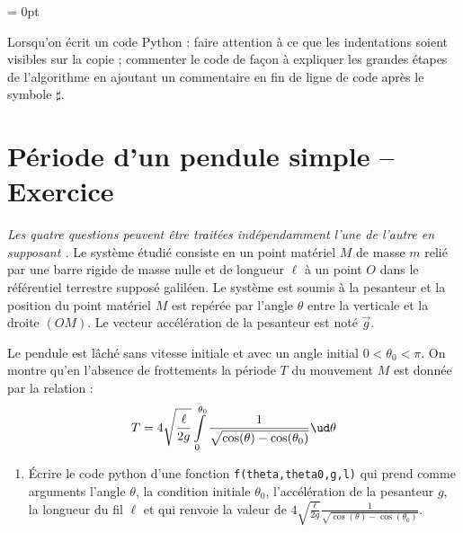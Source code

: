 
\parindent= 0pt
\textheight 250mm

  \pagestyle{fancy}
  \fancyfoot[C]{\thepage}
  


 \begin{center}
  \begin{large}
  \end{large}
 \end{center}

\begin{boxedminipage}{\textwidth} 
Lorsqu'on écrit un code Python : faire attention à ce que les indentations soient visibles sur la copie ; commenter le code de façon à expliquer les grandes étapes de l'algorithme en ajoutant un commentaire en fin de ligne de code après le symbole $\sharp$.
\end{boxedminipage}

\section{Période d'un pendule simple -- Exercice}
\textit{Les quatre questions peuvent être traitées indépendamment l'une de l'autre en supposant .}
Le système étudié consiste en un point matériel $M$ de masse $m$ relié par une barre rigide de masse nulle et de longueur $\ell$ à un point $O$ dans le référentiel terrestre supposé galiléen. Le système est soumis à la pesanteur et la position du point matériel $M$ est repérée par l'angle $\theta$ entre la verticale et la droite $(OM)$. Le vecteur accélération de la pesanteur est noté $\vec g$.

Le pendule est lâché sans vitesse initiale et avec un angle initial $0< \theta_0 < \pi$. On montre qu'en l'absence de frottements la période $T$ du mouvement $M$ est donnée par la relation : $$T = 4\sqrt{\frac{\ell}{2g}}\int\limits_0^{\theta_0} \frac{1}{\sqrt{\cos(\theta)-\cos(\theta_0)}}\ud\theta$$

\begin{enumerate}
 \item Écrire le code python d'une fonction \texttt{f(theta,theta0,g,l)} qui prend comme arguments l'angle $\theta$, la condition initiale $\theta_0$, l'accélération de la pesanteur $g$, la longueur du fil $\ell$ et qui renvoie la valeur de $4\sqrt{\tfrac{\ell}{2g}}\tfrac{1}{\sqrt{\cos(\theta)-\cos(\theta_0)}}$.
\end{enumerate}

